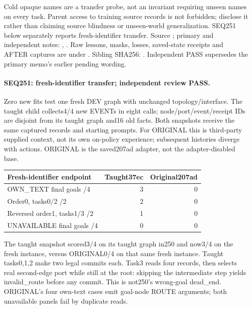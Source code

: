 \documentclass{article}
\begin{document}
Cold opaque names are a transfer probe, not an invariant requiring unseen names
on every task. Parent access to training source records is not forbidden;
disclose it rather than claiming source blindness or unseen-world generalization.
SEQ251 below separately reports fresh-identifier transfer. Source
; primary and independent notes:
,
.
Raw lessons, masks, losses, saved-state receipts and AFTER captures are under
.
Sibling  SHA256:
.
Independent PASS supersedes the primary memo's earlier pending wording.

\paragraph{SEQ251: fresh-identifier transfer; independent review PASS.}
Zero new fits test one fresh DEV graph with unchanged topology/interface.
The taught child collects4/4 new EVENTs in eight calls; node/port/event/receipt
IDs are disjoint from its taught graph and16 old facts. Both snapshots receive
the same captured records and starting prompts. For ORIGINAL this is third-party
supplied context, not its own on-policy experience; subsequent histories diverge
with actions. ORIGINAL is the saved207ad adapter, not the adapter-disabled base.
\begin{center}
\small
\begin{tabular}{lrr}
\toprule
Fresh-identifier endpoint & Taught37ec & Original207ad \\
\midrule
OWN\_TEXT final goals /4 & 3 & 0 \\
Order0, tasks0/2 /2 & 2 & 0 \\
Reversed order1, tasks1/3 /2 & 1 & 0 \\
UNAVAILABLE final goals /4 & 0 & 0 \\
\bottomrule
\end{tabular}
\end{center}
The taught snapshot scored3/4 on its taught graph in250 and now3/4 on the fresh
instance, versus ORIGINAL0/4 on that same fresh instance. Taught tasks0,1,2 make
two legal commits each. Task3 reads four records, then selects real second-edge
port  while still at the root: skipping the intermediate
step yields invalid\_route before any commit. This is not250's wrong-goal
dead\_end. ORIGINAL's four own-text cases emit goal-node ROUTE arguments;
both unavailable panels fail by duplicate reads.
\end{document}
